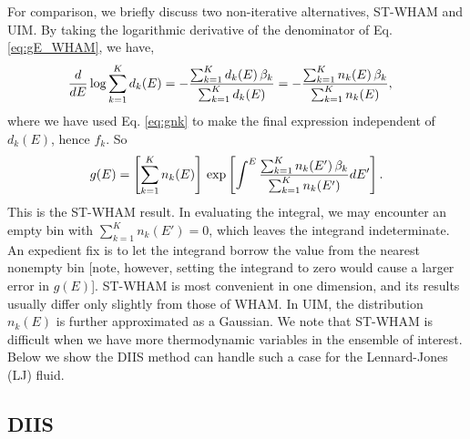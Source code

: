 \documentclass[reprint,aip,jcp,superscriptaddress]{revtex4-1}
\begin{document}
For comparison,
we briefly discuss
two non-iterative alternatives, ST-WHAM\cite{
kim2011}
and UIM\cite{
kastner2005, *kastner2009}.
%
By taking the logarithmic derivative of
the denominator of Eq. \eqref{eq:gE_WHAM},
we have,
%
\begin{align}
\frac{d}{dE}
\log
  \sum_{k = 1}^K d_k(E)
&=
-
\frac{
  \sum_{k = 1}^K d_k(E) \, \beta_k
}
{
  \sum_{k = 1}^K d_k(E)
}
=
-
\frac{
  \sum_{k = 1}^K n_k(E) \, \beta_k
}
{
  \sum_{k = 1}^K n_k(E)
},
\notag
\end{align}
%
{
where
we have used Eq. \eqref{eq:gnk}
to make the final expression
independent of $d_k(E)$, hence $f_k$.
}
%
So
\begin{align}
g(E)
=
\left[
  \sum_{k = 1}^K n_k(E)
\right]
\,
\exp
\left[
\int^E
    \frac{ \sum_{k = 1}^K n_k(E') \, \beta_k }
         { \sum_{k = 1}^K n_k(E') }
  dE'
\right].
\notag
\end{align}
%
This is the ST-WHAM result.
%
In evaluating the integral,
we may encounter an empty bin
with $\sum_{k = 1}^K n_k(E') = 0$,
which leaves the integrand indeterminate.
%
An expedient fix is to let the integrand borrow
the value from the nearest nonempty bin
%
[note, however, setting the integrand to zero
would cause a larger error in $g(E)$].
%
ST-WHAM is most convenient in one dimension,
and its results usually differ only slightly from those of WHAM\cite{kim2011}.
%
In UIM\cite{
kastner2005, *kastner2009},
the distribution $n_k(E)$
is further approximated as a Gaussian.
%
We note that ST-WHAM is difficult when we have more
thermodynamic variables in the ensemble of interest.
%
Below we show the DIIS method can
 handle such a case
for the Lennard-Jones (LJ) fluid.




\subsection{\label{sec:DIIS}DIIS}
\end{document}
